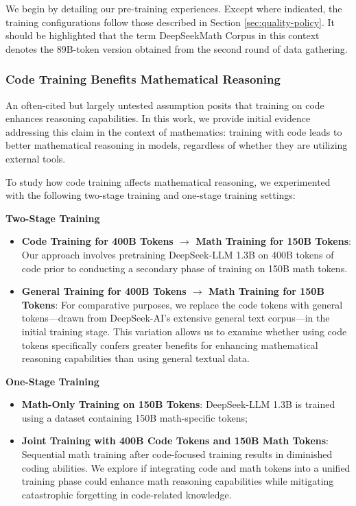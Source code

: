 \begin{itemize}[topsep=0pt]
\begin{itemize}[topsep=0pt]
We begin by detailing our pre-training experiences. Except where indicated, the training configurations follow those described in Section \ref{sec:quality-policy}. It should be highlighted that the term DeepSeekMath Corpus in this context denotes the 89B-token version obtained from the second round of data gathering.

\subsubsection{Code Training Benefits Mathematical Reasoning}

An often-cited but largely untested assumption posits that training on code enhances reasoning capabilities. In this work, we provide initial evidence addressing this claim in the context of mathematics: training with code leads to better mathematical reasoning in models, regardless of whether they are utilizing external tools.

To study how code training affects mathematical reasoning, we experimented with the following two-stage training and one-stage training settings:

\textbf{Two-Stage Training}

\begin{itemize}[topsep=0pt]
    \item \textbf{Code Training for 400B Tokens $\rightarrow$ Math Training for 150B Tokens}: Our approach involves pretraining DeepSeek-LLM 1.3B on 400B tokens of code prior to conducting a secondary phase of training on 150B math tokens.
    \item \textbf{General Training for 400B Tokens $\rightarrow$ Math Training for 150B Tokens}: For comparative purposes, we replace the code tokens with general tokens—drawn from DeepSeek-AI’s extensive general text corpus—in the initial training stage. This variation allows us to examine whether using code tokens specifically confers greater benefits for enhancing mathematical reasoning capabilities than using general textual data.
\end{itemize}

\textbf{One-Stage Training}

\begin{itemize}[topsep=0pt]
    \item \textbf{Math-Only Training on 150B Tokens}: DeepSeek-LLM 1.3B is trained using a dataset containing 150B math-specific tokens;
    \item \textbf{Joint Training with 400B Code Tokens and 150B Math Tokens}: Sequential math training after code-focused training results in diminished coding abilities. We explore if integrating code and math tokens into a unified training phase could enhance math reasoning capabilities while mitigating catastrophic forgetting in code-related knowledge.
\end{itemize}


\end{itemize}
\end{itemize}

